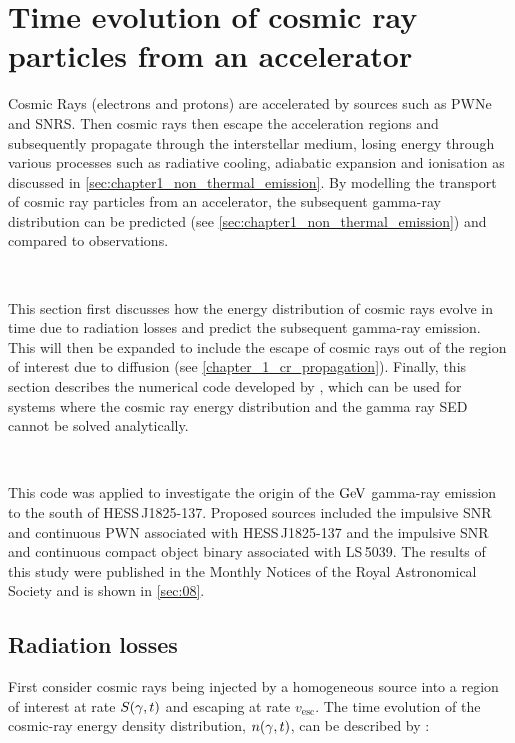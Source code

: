 \chapter[Time evolution of CR particles]{Time evolution of cosmic ray particles from an accelerator} \label{sec:07_particle_ev}

Cosmic Rays (electrons and protons) are accelerated by sources such as PWNe and SNRS. Then cosmic rays then escape the acceleration regions and subsequently propagate through the interstellar medium, losing energy through various processes such as radiative cooling, adiabatic expansion and ionisation as discussed in \autoref{sec:chapter1_non_thermal_emission}. By modelling the transport of cosmic ray particles from an accelerator, the subsequent gamma-ray distribution can be predicted (see \autoref{sec:chapter1_non_thermal_emission}) and compared to observations.
\par~\par
This section first discusses how the energy distribution of cosmic rays evolve in time due to radiation losses and predict the subsequent gamma-ray emission. This will then be expanded to include the escape of cosmic rays out of the region of interest due to diffusion (see \autoref{chapter_1_cr_propagation}). Finally, this section describes the numerical code developed by \cite{fabien}, which can be used for systems where the cosmic ray energy distribution and the gamma ray SED cannot be solved analytically.
\par~\par
This code was applied to investigate the origin of the $\si{\giga\electronvolt}$ gamma-ray emission to the south of \mbox{HESS\,J1825-137}. Proposed sources included the impulsive SNR and continuous PWN associated with \mbox{HESS\,J1825-137} and the impulsive SNR and continuous compact object binary associated with \mbox{LS\,5039}. The results of this study were published in the Monthly Notices of the Royal Astronomical Society and is shown in \autoref{sec:08}.

\section{Radiation losses} \label{sec:chapter_7_cr_SED_evol} 

First consider cosmic rays being injected by a homogeneous source into a region of interest at rate $S\qty(\gamma,t)$ and escaping at rate $v_\text{esc}$. The time evolution of the cosmic-ray energy density distribution, $n\qty(\gamma,t)$, can be described by \citep{1980gbs..bookR....M}:

